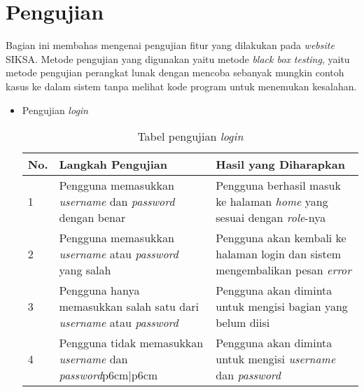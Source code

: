 \section{Pengujian}
\label{sec:pengujian}
Bagian ini membahas mengenai pengujian fitur yang dilakukan pada \textit{website} SIKSA. Metode pengujian yang digunakan yaitu metode \textit{black box testing}, yaitu metode pengujian perangkat lunak dengan mencoba sebanyak mungkin contoh kasus ke dalam sistem tanpa melihat kode program untuk menemukan kesalahan.
\begin{itemize}
	\item Pengujian \textit{login}
	\begin{table}[H]
	\centering
	\caption{Tabel pengujian \textit{login}}
	\label{pengujian_login}
	\begin{tabular}{|l|p{6cm}|p{6cm}|}
	\hline
	\textbf{No.}&\textbf{Langkah Pengujian}&\textbf{Hasil yang Diharapkan}\\ \hline
	1&Pengguna memasukkan \textit{username} dan \textit{password} dengan benar&Pengguna berhasil masuk ke halaman \textit{home} yang sesuai dengan \textit{role}-nya \\ \hline
	2&Pengguna memasukkan \textit{username} atau \textit{password} yang salah &Pengguna akan kembali ke halaman login dan sistem mengembalikan pesan \textit{error}\\ \hline
	3&Pengguna hanya memasukkan salah satu dari \textit{username} atau \textit{password}&Pengguna akan diminta untuk mengisi bagian yang belum diisi\\ \hline
	4&Pengguna tidak memasukkan \textit{username} dan \textit{password}p{6cm}|p{6cm}&Pengguna akan diminta untuk mengisi \textit{username} dan \textit{password}\\ \hline
	\end{tabular}
	\end{table}	
	

\end{itemize}
